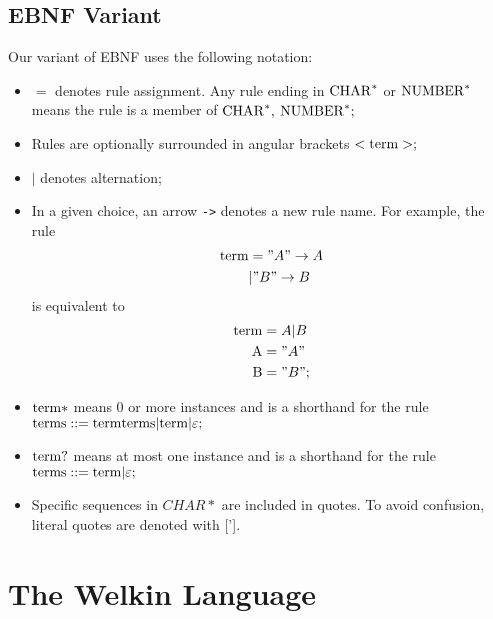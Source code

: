 \subsection{EBNF Variant}
Our variant of EBNF uses the following notation:
\begin{itemize}
	\item $=$ denotes rule assignment. Any rule ending in $\mathrm{CHAR}^{*}$ or $\mathrm{NUMBER}^{*}$ means the rule is a member of $\mathrm{CHAR}^{*},$ $\mathrm{NUMBER}^{*};$
	\item Rules are optionally surrounded in angular brackets $<\mathrm{term}>;$
	\item $|$ denotes alternation;
	\item In a given choice, an arrow \texttt{->} denotes a new rule name. For example, the rule
				\begin{align*}
					\mathrm{term} &= "A" \to A \\
								&| "B" \to  B
				\end{align*}
				is equivalent to
				\begin{align*}
					\mathrm{term} &= A | B \\
					\textrm{A} &= "A"\\
					\textrm{B} &= "B";
				\end{align*}
	\item $\mathrm{term}*$ means 0 or more instances and is a shorthand for the rule $\mathrm{terms} ::= \mathrm{term} \mathrm{terms} | \mathrm{term} | \varepsilon;$
	\item $\mathrm{term}?$ means at most one instance and is a shorthand for the rule $\mathrm{terms} ::= \mathrm{term} | \varepsilon;$
	\item Specific sequences in $CHAR*$ are included in quotes. To avoid confusion, literal quotes are denoted with [']. %
\end{itemize}

\section{The Welkin Language}

